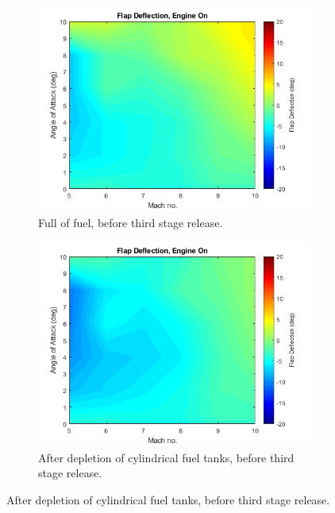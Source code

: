 		
		 
		 
		

		
		
		
		\begin{figure}[!ht]
			\begin{subfigure}{.5\textwidth}
				\centering
				\includegraphics[width=0.99\linewidth]{figures/3_vehicle_design/FlapEngineCG1}
				\caption{Full of fuel, before third stage release.}
			\end{subfigure}
			\begin{subfigure}{.5\textwidth}
				\centering
				\includegraphics[width=0.99\linewidth]{figures/3_vehicle_design/FlapEngineCG2}
				\caption{After depletion of cylindrical fuel tanks, before third stage release.}
				

\end{subfigure}
\end{figure}
